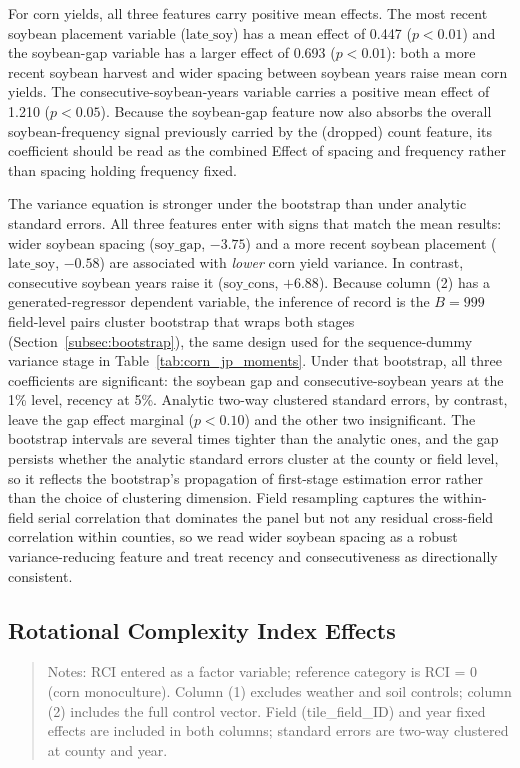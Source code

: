 \documentclass[12pt,letterpaper]{article}
\theoremstyle{remark}
\theoremstyle{remark}
\theoremstyle{plain}
\theoremstyle{definition}
\begin{document}
For corn yields, all three features carry positive mean effects. The most recent soybean placement variable ($\text{late\_soy}$) has a mean effect of 0.447 ($p<0.01$) and the soybean-gap variable has a larger effect of 0.693 ($p<0.01$): both a more recent soybean harvest and wider spacing between soybean years raise mean corn yields. The consecutive-soybean-years variable carries a positive mean effect of 1.210 ($p<0.05$). Because the soybean-gap feature now also absorbs the overall soybean-frequency signal previously carried by the (dropped) count feature, its coefficient should be read as the combined Effect of spacing and frequency rather than spacing holding frequency fixed.

The variance equation is stronger under the bootstrap than under analytic standard errors. All three features enter with signs that match the mean results: wider soybean spacing ($\text{soy\_gap}$, $-3.75$) and a more recent soybean placement ($\text{late\_soy}$, $-0.58$) are associated with \emph{lower} corn yield variance. In contrast, consecutive soybean years raise it ($\text{soy\_cons}$, $+6.88$). Because column (2) has a generated-regressor dependent variable, the inference of record is the $B=999$ field-level pairs cluster bootstrap that wraps both stages (Section~\ref{subsec:bootstrap}), the same design used for the sequence-dummy variance stage in Table~\ref{tab:corn_jp_moments}. Under that bootstrap, all three coefficients are significant: the soybean gap and consecutive-soybean years at the 1\% level, recency at 5\%. Analytic two-way clustered standard errors, by contrast, leave the gap effect marginal ($p<0.10$) and the other two insignificant. The bootstrap intervals are several times tighter than the analytic ones, and the gap persists whether the analytic standard errors cluster at the county or field level, so it reflects the bootstrap's propagation of first-stage estimation error rather than the choice of clustering dimension. Field resampling captures the within-field serial correlation that dominates the panel but not any residual cross-field correlation within counties, so we read wider soybean spacing as a robust variance-reducing feature and treat recency and consecutiveness as directionally consistent.
\subsection{\label{subsec:rci_effects}Rotational Complexity Index Effects}


\begin{quote}
\small
Notes: RCI entered as a factor variable; reference category is RCI = 0 (corn monoculture). Column (1) excludes weather and soil controls; column (2) includes the full control vector. Field (tile\_field\_ID) and year fixed effects are included in both columns; standard errors are two-way clustered at county and year.
\end{quote}
\end{document}
